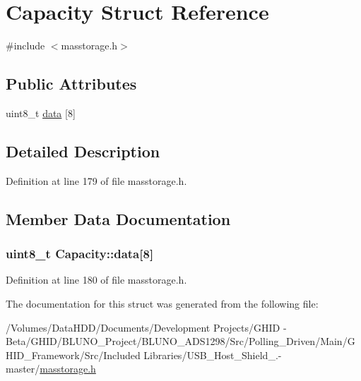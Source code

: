 \hypertarget{struct_capacity}{\section{\-Capacity \-Struct \-Reference}
\label{struct_capacity}
}


{\ttfamily \#include $<$masstorage.\-h$>$}

\subsection*{\-Public \-Attributes}
\begin{DoxyCompactItemize}
\item 
uint8\-\_\-t \hyperlink{struct_capacity_ae6dd521cd2ece3d6fa6fe58180fb9e8a}{data} \mbox{[}8\mbox{]}
\end{DoxyCompactItemize}


\subsection{\-Detailed \-Description}


\-Definition at line 179 of file masstorage.\-h.



\subsection{\-Member \-Data \-Documentation}
\hypertarget{struct_capacity_ae6dd521cd2ece3d6fa6fe58180fb9e8a}{
\subsubsection[{data}]{\setlength{\rightskip}{0pt plus 5cm}uint8\-\_\-t {\bf \-Capacity\-::data}\mbox{[}8\mbox{]}}}\label{struct_capacity_ae6dd521cd2ece3d6fa6fe58180fb9e8a}


\-Definition at line 180 of file masstorage.\-h.



\-The documentation for this struct was generated from the following file\-:\begin{DoxyCompactItemize}
\item 
/\-Volumes/\-Data\-H\-D\-D/\-Documents/\-Development Projects/\-G\-H\-I\-D -\/ Beta/\-G\-H\-I\-D/\-B\-L\-U\-N\-O\-\_\-\-Project/\-B\-L\-U\-N\-O\-\_\-\-A\-D\-S1298/\-Src/\-Polling\-\_\-\-Driven/\-Main/\-G\-H\-I\-D\-\_\-\-Framework/\-Src/\-Included Libraries/\-U\-S\-B\-\_\-\-Host\-\_\-\-Shield\-\_.-\/master/\hyperlink{masstorage_8h}{masstorage.\-h}\end{DoxyCompactItemize}
